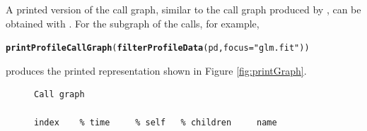 \documentclass[nojss]{jss}\usepackage[]{graphicx}\usepackage[]{color}
\makeatletter
\newcommand{\hlstr}[1]{\textcolor[rgb]{0.192,0.494,0.8}{#1}}%
\newcommand{\hlstd}[1]{\textcolor[rgb]{0.345,0.345,0.345}{#1}}%
\newcommand{\hlkwc}[1]{\textcolor[rgb]{0.333,0.667,0.333}{#1}}%
\newcommand{\hlkwd}[1]{\textcolor[rgb]{0.737,0.353,0.396}{\textbf{#1}}}%
\newenvironment{kframe}{%
 \def\at@end@of@kframe{}%
 \ifinner\ifhmode%
  \def\at@end@of@kframe{\end{minipage}}%
  \begin{minipage}{\columnwidth}%
 \fi\fi%
 \def\FrameCommand##1{\hskip\@totalleftmargin \hskip-\fboxsep
 \colorbox{shadecolor}{##1}\hskip-\fboxsep
     \hskip-\linewidth \hskip-\@totalleftmargin \hskip\columnwidth}%
 \MakeFramed {\advance\hsize-\width
   \@totalleftmargin\z@ \linewidth\hsize
   \@setminipage}}%
 {\par\unskip\endMakeFramed%
 \at@end@of@kframe}
\newenvironment{knitrout}{}{} %
\makeatother
\begin{document}
A printed version of the call graph, similar to the call graph
produced by  \citep{Graham:1982:GCG:800230.806987}, can be
obtained with .  For the subgraph of the
 calls, for example,
\begin{knitrout}\small
{}\color{fgcolor}\begin{kframe}
\begin{alltt}
\hlkwd{printProfileCallGraph}\hlstd{(}\hlkwd{filterProfileData}\hlstd{(pd,} \hlkwc{focus} \hlstd{=} \hlstr{"glm.fit"}\hlstd{))}
\end{alltt}
\end{kframe}
\end{knitrout}
produces the printed representation shown in Figure \ref{fig:printGraph}.
\begin{figure}
  \tiny
\begin{knitrout}\small
{}\color{fgcolor}\begin{kframe}
\begin{verbatim}
Call graph

index    % time     % self   % children     name


\end{verbatim}
\end{kframe}
\end{knitrout}
\end{figure}
\end{document}
